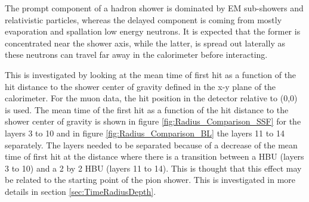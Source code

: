 The prompt component of a hadron shower is dominated by EM sub-showers and relativistic particles, whereas the delayed component is coming from mostly evaporation and spallation low energy neutrons. It is expected that the former is concentrated near the shower axis, while the latter, is spread out laterally as these neutrons can travel far away in the calorimeter before interacting.

This is investigated by looking at the mean time of first hit as a function of the hit distance to the shower center of gravity defined in the x-y plane of the calorimeter. For the muon data, the hit position in the detector relative to (0,0) is used. The mean time of the first hit as a function of the hit distance to the shower center of gravity is shown in figure \ref{fig:Radius_Comparison_SSF} for the layers 3 to 10 and in figure \ref{fig:Radius_Comparison_BL} the layers 11 to 14 separately. The layers needed to be separated because of a decrease of the mean time of first hit at the distance where there is a transition between a HBU (layers 3 to 10) and a 2 by 2 HBU (layers 11 to 14). This is thought that this effect may be related to the starting point of the pion shower. This is investigated in more details in section \ref{sec:TimeRadiusDepth}.

